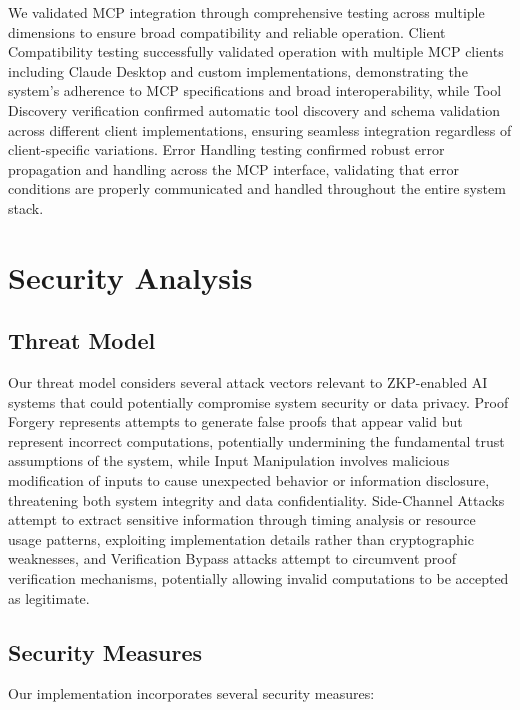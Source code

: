 \documentclass[11pt]{article}
\begin{document}
We validated MCP integration through comprehensive testing across multiple dimensions to ensure broad compatibility and reliable operation. Client Compatibility testing successfully validated operation with multiple MCP clients including Claude Desktop and custom implementations, demonstrating the system's adherence to MCP specifications and broad interoperability, while Tool Discovery verification confirmed automatic tool discovery and schema validation across different client implementations, ensuring seamless integration regardless of client-specific variations. Error Handling testing confirmed robust error propagation and handling across the MCP interface, validating that error conditions are properly communicated and handled throughout the entire system stack.

\section{Security Analysis}
\label{sec:security}

\subsection{Threat Model}

Our threat model considers several attack vectors relevant to ZKP-enabled AI systems that could potentially compromise system security or data privacy. Proof Forgery represents attempts to generate false proofs that appear valid but represent incorrect computations, potentially undermining the fundamental trust assumptions of the system, while Input Manipulation involves malicious modification of inputs to cause unexpected behavior or information disclosure, threatening both system integrity and data confidentiality. Side-Channel Attacks attempt to extract sensitive information through timing analysis or resource usage patterns, exploiting implementation details rather than cryptographic weaknesses, and Verification Bypass attacks attempt to circumvent proof verification mechanisms, potentially allowing invalid computations to be accepted as legitimate.

\subsection{Security Measures}

Our implementation incorporates several security measures:
\end{document}
